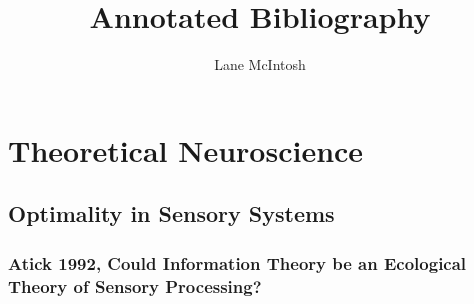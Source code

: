 \documentclass{article}
\begin{document}
\title{Annotated Bibliography}
\author{Lane McIntosh}
\maketitle
\tableofcontents

\section{Theoretical Neuroscience}
\subsection{Optimality in Sensory Systems}
\subsubsection{Atick 1992, Could Information Theory be an Ecological Theory of Sensory Processing?}
\end{document}
